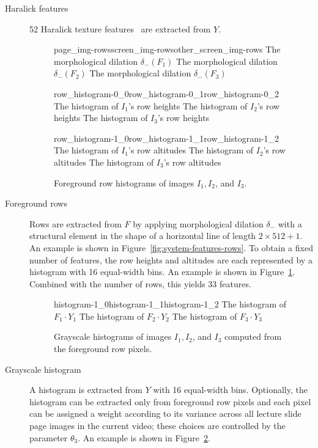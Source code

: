 \begin{description}
  \item[Haralick features]
    52 Haralick texture features~\cite{haralick1973textural} are extracted from $Y$.

  \begin{figure}
      {page_img-rows}{screen_img-rows}{other_screen_img-rows}%
      {The morphological dilation $\delta_{{}-{}}(F_1)$}%
      {The morphological dilation $\delta_{{}-{}}(F_2)$}%
      {The morphological dilation $\delta_{{}-{}}(F_3)$}
    \caption{Foreground rows of images $I_1,I_2$, and $I_3$.}
    \label{fig:system-features-rows}

    \kern\floatsep
    {\setlength{\fboxrule}{0pt}%
       {row_histogram-0_0}{row_histogram-0_1}{row_histogram-0_2}%
       {The histogram of $I_1$'s row heights}%
       {The histogram of $I_2$'s row heights}%
       {The histogram of $I_3$'s row heights}\par
       {row_histogram-1_0}{row_histogram-1_1}{row_histogram-1_2}%
       {The histogram of $I_1$'s row altitudes}%
       {The histogram of $I_2$'s row altitudes}%
       {The histogram of $I_3$'s row altitudes}}
    \caption{Foreground row histograms of images $I_1,I_2$, and $I_3$.}
    \label{fig:system-features-row-histograms}
  \end{figure}
  \item[Foreground rows]
    Rows are extracted from $F$ by applying morphological dilation $\delta_{{}-{}}$ with
    a structural element in the shape of a horizontal line of length $2\times
    512+1$. An example is shown in Figure~\ref{fig:system-features-rows}.
    To obtain a fixed number of features, the row heights and altitudes are each
    represented by a histogram with 16 equal-width bins. An example is shown in
    Figure~\ref{fig:system-features-row-histograms}. Combined with the number
    of rows, this yields 33 features.

  \begin{figure}
    {\setlength{\fboxrule}{0pt}%
       {histogram-1_0}{histogram-1_1}{histogram-1_2}%
       {The histogram of $F_1\cdot Y_1$}%
       {The histogram of $F_2\cdot Y_2$}%
       {The histogram of $F_3\cdot Y_3$}}
    \caption{Grayscale histograms of images $I_1,I_2$, and $I_3$ computed from
      the foreground row pixels.}
    \label{fig:system-features-grayscale-histogram}
  \end{figure}
  \item[Grayscale histogram]
    A histogram is extracted from $Y$ with 16 equal-width bins. Optionally, the
    histogram can be extracted only from foreground row pixels and each pixel
    can be assigned a weight according to its variance across all lecture slide
    page images in the current video; these choices are controlled by the
    parameter $\theta_3$. An example is shown in
    Figure~\ref{fig:system-features-grayscale-histogram}.
\end{description}


